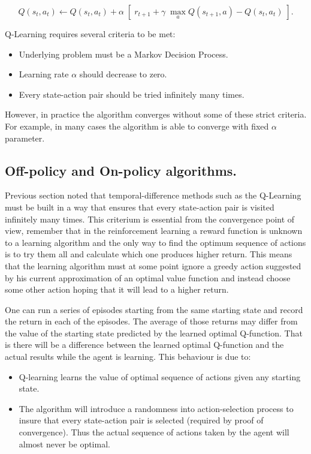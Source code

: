 $$ Q(s_{t},a_{t}) \leftarrow Q(s_{t},a_{t}) + \alpha \; \left[\;r_{t+1} + \gamma\; \max_{a}Q(s_{t+1},a) - Q(s_{t},a_{t})\;\right]. $$

Q-Learning requires several criteria to be met:
\begin{itemize}
  \item Underlying problem must be a Markov Decision Process.
  \item Learning rate $ \alpha $ should decrease to zero.
  \item Every state-action pair should be tried infinitely many times.
\end{itemize}
However, in practice the algorithm converges without some of these strict criteria. For example, in many cases the algorithm is able to converge with fixed $ \alpha $ parameter.

\subsection{Off-policy and On-policy algorithms.}
Previous section noted that temporal-difference methods such as the Q-Learning must be built in a way that ensures that every state-action pair is visited infinitely many times. This criterium is essential from the convergence point of view, remember that in the reinforcement learning a reward function is unknown to a learning algorithm and the only way to find the optimum sequence of actions is to try them all and calculate which one produces higher return. This means that the learning algorithm must at some point ignore a greedy action suggested by his current approximation of an optimal value function and instead choose some other action hoping that it will lead to a higher return.

One can run a series of episodes starting from the same starting state and record the return in each of the episodes. The average of those returns may differ from the value of the starting state predicted by the learned optimal Q-function. That is there will be a difference between the learned optimal Q-function and the actual results while the agent is learning. This behaviour is due to:
\begin{itemize}
  \item Q-learning learns the value of optimal sequence of actions given any starting state.
  \item The algorithm will introduce a randomness into action-selection process to insure that every state-action pair is selected (required by proof of convergence). Thus the actual sequence of actions taken by the agent will almost never be optimal.
\end{itemize}


